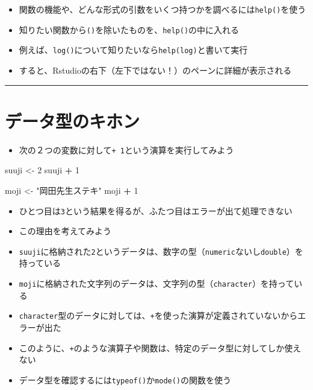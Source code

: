 \documentclass[
]{book}
\newenvironment{Shaded}{\begin{snugshade}}{\end{snugshade}}
\newcommand{\DecValTok}[1]{\textcolor[rgb]{0.00,0.00,0.81}{#1}}
\newcommand{\NormalTok}[1]{#1}
\newcommand{\OtherTok}[1]{\textcolor[rgb]{0.56,0.35,0.01}{#1}}
\newcommand{\SpecialCharTok}[1]{\textcolor[rgb]{0.81,0.36,0.00}{\textbf{#1}}}
\newcommand{\StringTok}[1]{\textcolor[rgb]{0.31,0.60,0.02}{#1}}
\providecommand{\tightlist}{%
  \setlength{\itemsep}{0pt}\setlength{\parskip}{0pt}}
\begin{document}
\begin{itemize}
\tightlist
\item
  関数の機能や、どんな形式の引数をいくつ持つかを調べるには\texttt{help()}を使う
\item
  知りたい関数から\texttt{()}を除いたものを、\texttt{help()}の中に入れる
\item
  例えば、\texttt{log()}について知りたいなら\texttt{help(log)}と書いて実行
\item
  すると、Rstudioの右下（左下ではない！）のペーンに詳細が表示される
\end{itemize}

\begin{center}\rule{0.5\linewidth}{0.5pt}\end{center}

\hypertarget{ux30c7ux30fcux30bfux578bux306eux30adux30dbux30f3}{%
\section{データ型のキホン}\label{ux30c7ux30fcux30bfux578bux306eux30adux30dbux30f3}}

\begin{itemize}
\tightlist
\item
  次の２つの変数に対して\texttt{+\ 1}という演算を実行してみよう
\end{itemize}

\begin{Shaded}
\begin{Highlighting}[]
\NormalTok{suuji }\OtherTok{\textless{}{-}} \DecValTok{2} 
\NormalTok{suuji }\SpecialCharTok{+} \DecValTok{1} 

\NormalTok{moji }\OtherTok{\textless{}{-}} \StringTok{"岡田先生ステキ"}
\NormalTok{moji }\SpecialCharTok{+} \DecValTok{1}
\end{Highlighting}
\end{Shaded}

\begin{itemize}
\tightlist
\item
  ひとつ目は\texttt{3}という結果を得るが、ふたつ目はエラーが出て処理できない
\item
  この理由を考えてみよう
\item
  \texttt{suuji}に格納された\texttt{2}というデータは、数字の型（\texttt{numeric}ないし\texttt{double}）を持っている\\
\item
  \texttt{moji}に格納された文字列のデータは、文字列の型（\texttt{character}）を持っている\\
\item
  \texttt{character}型のデータに対しては、\texttt{+}を使った演算が定義されていないからエラーが出た\\
\item
  このように、\texttt{+}のような演算子や関数は、特定のデータ型に対してしか使えない
\item
  データ型を確認するには\texttt{typeof()}か\texttt{mode()}の関数を使う
\end{itemize}
\end{document}

